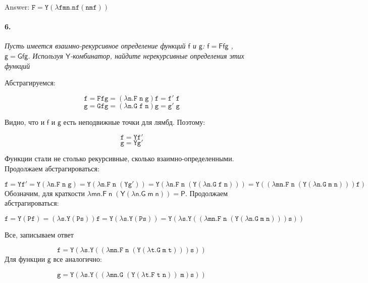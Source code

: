 \documentclass[russian]{article}
\begin{document}
Answer: $\mathtt{F = Y(\lambda fmn.nf(nmf))}$

\paragraph*{6.} \textit{Пусть имеется взаимно-рекурсивное определение функций $\mathsf{f}$ и $\mathsf{g}$: $\mathsf{f = Ffg}$ , $\mathsf{g = Gfg}$. Используя $\mathsf{Y}$-комбинатор, найдите нерекурсивные определения этих функций}

Абстрагируемся:

\[
\mathtt{f = Ffg = (\lambda n.F\;n\;g)f = f'\;f}
\]
\[
\mathtt{g = Gfg = (\lambda n.G\;f\;n)g = g'\;g}
\]

Видно, что и $\mathsf{f}$ и $\mathsf{g}$ есть неподвижные точки для лямбд. Поэтому:

\[
\mathtt{f = Yf'}
\]
\[
\mathtt{g = Yg'}
\]

Функции стали не столько рекурсивные, сколько взаимно-определенными. Продолжаем абстрагироваться:

\[
\mathtt{f = Yf' = Y(\lambda n.F\;n\;g) = Y(\lambda n.F\;n\;(Yg')) = Y(\lambda n.F\;n\;(Y(\lambda n.G\;f\;n))) = Y((\lambda mn.F\;n\;(Y(\lambda n.G\;m\;n)))f)}
\]
Обозначим, для краткости $\mathsf{\lambda mn.F\;n\;(Y(\lambda n.G\;m\;n)) = P}$. Продолжаем абстрагироваться:

\[
\mathtt{f = Y(Pf) = (\lambda s.Y(Ps))f = Y(\lambda s.Y(Ps)) = Y(\lambda s.Y((\lambda mn.F\;n\;(Y(\lambda n.G\;m\;n)))s))}
\]

Все, записываем ответ

\[
\mathtt{f = Y(\lambda s.Y((\lambda mn.F\;n\;(Y(\lambda t.G\;m\;t)))s))}
\]
Для функции $\mathsf{g}$ все аналогично: 

\[
\mathtt{g = Y(\lambda s.Y((\lambda mn.G\;(Y(\lambda t.F\;t\;n))\;m)s))}
\]
\end{document}
